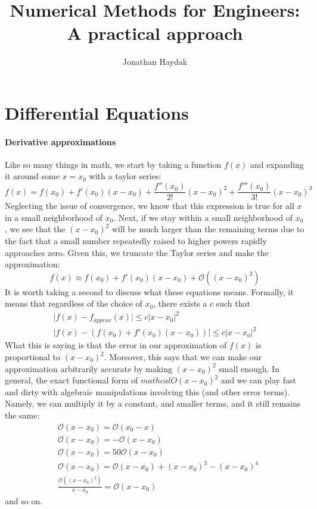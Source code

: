 \documentclass[]{article}
\title{Numerical Methods for Engineers: A practical approach}
\author{Jonathan Haydak}
\theoremstyle{definition}
\numberwithin{equation}{section}
\begin{document}
	\maketitle
	\setlength\cellspacetoplimit{4pt}
	\setlength\cellspacebottomlimit{4pt}
	\tableofcontents
	\newcommand{\dydx}[2]{\frac{\text{d}{#1}}{\text{d} {#2}}}
	\newcommand{\der}[1]{\frac{\partial}{\partial {#1}}}
	\part{Differential Equations}
	\subsection{Derivative approximations}
	Like so many things in math, we start by taking a function $f(x)$ and expanding it around some $x = x_0$ with a taylor series:
	\begin{equation}
	f(x) = f(x_0) + f'(x_0) (x-x_0) + \frac{f''(x_0)}{2!} (x-x_0)^2 + \frac{f'''(x_0)}{3!} (x-x_0)^3 
	\end{equation}
	Neglecting the issue of convergence, we know that this expression is true for all $x$ in a small neighborhood of $x_0$. Next, if we stay within a small neighborhood of $x_0$, we see that the $(x-x_0)^2$ will be much larger than the remaining terms due to the fact that a small number repeatedly raised to higher powers rapidly approaches zero. Given this, we truncate the Taylor series and make the approximation:
	\begin{equation}
	f(x) \approx f(x_0) + f'(x_0) (x-x_0) + \mathcal{O}\left((x-x_0)^2 \right) \label{d1}
	\end{equation}
	It is worth taking a second to discuss what these equations means. Formally, it means that regardless of the choice of $x_0$, there exists a $c$ such that 
	\begin{align}
	\lvert f(x) - f_{approx}(x) \rvert \leq c \lvert x- x_0 \rvert^2 \nonumber \\
	\lvert f(x) - \left( f(x_0) + f'(x_0) (x-x_0) \right) \rvert \leq c \lvert x- x_0 \rvert^2
	\end{align}
	What this is saying is that the error in our approximation of $f(x)$ is proportional to $(x-x_0)^2$. Moreover, this says that we can make our approximation arbitrarily accurate by making $(x-x_0)^2$ small enough. In general, the exact functional form of $mathcal{O}(x-x_0)^2$ and we can play fast and dirty with algebraic manipulations involving this (and other error terms). Namely, we can multiply it by a constant, and smaller terms, and it still remains the same:
	\begin{align*}
	&\mathcal{O} (x-x_0) = \mathcal{O} (x_0 - x) \\
	&\mathcal{O}(x-x_0) = -\mathcal{O}(x-x_0) \\
	&\mathcal{O}(x-x_0) = 50\mathcal{O}(x-x_0) \\
	&\mathcal{O}(x-x_0) = \mathcal{O}(x-x_0) + (x-x_0)^3 - (x-x_0)^4 \\
	&\frac{\mathcal{O}(\left(x-x_0\right)^2)}{x-x_0} = \mathcal{O}(x-x_0) 
	\end{align*}
	and so on.
	
\end{document}
